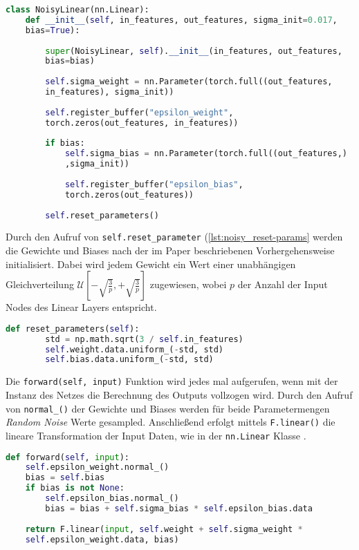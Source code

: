 \documentclass[11pt]{scrartcl}
\begin{document}
\begin{lstlisting}[language=Python, caption=Konstruktor Noisy Layer, label=lst:noisy-layer]
class NoisyLinear(nn.Linear):
	def __init__(self, in_features, out_features, sigma_init=0.017, 
	bias=True):
		
		super(NoisyLinear, self).__init__(in_features, out_features,
		bias=bias)
		
		self.sigma_weight = nn.Parameter(torch.full((out_features,
		in_features), sigma_init))
		
		self.register_buffer("epsilon_weight", 
		torch.zeros(out_features, in_features))
		
		if bias:
    		self.sigma_bias = nn.Parameter(torch.full((out_features,)
    		,sigma_init))
    		
    		self.register_buffer("epsilon_bias", 
    		torch.zeros(out_features))
    		
		self.reset_parameters()
\end{lstlisting}

Durch den Aufruf von \lstinline!self.reset_parameter! (\ref{lst:noisy_reset-params} werden die
Gewichte und Biases nach der im Paper beschriebenen Vorhergehensweise initialisiert. Dabei wird
jedem Gewicht ein Wert einer unabhängigen Gleichverteilung
$\mathcal{U}[-\sqrt{\frac{3}{p}},+\sqrt{\frac{3}{p}}]$ zugewiesen, wobei $p$ der Anzahl der
Input Nodes des Linear Layers entspricht.
 
\begin{lstlisting}[language=Python, caption=Reinitialisierung der Gewichte und Biases, 
label=lst:noisy_reset-params]
	def reset_parameters(self):
		std = np.math.sqrt(3 / self.in_features)
		self.weight.data.uniform_(-std, std)
		self.bias.data.uniform_(-std, std)
\end{lstlisting}

Die \lstinline!forward(self, input)! Funktion wird jedes mal aufgerufen, wenn mit der Instanz
des Netzes die Berechnung des Outputs vollzogen wird. Durch den Aufruf von 
\lstinline!normal_()! der Gewichte und Biases werden für beide Parametermengen 
\textit{Random Noise} Werte gesampled. Anschließend erfolgt mittels \lstinline!F.linear()!
die lineare Transformation der Input Daten, wie in der \lstinline!nn.Linear! Klasse 
\cite[~S.179 ff.]{L2018}.

\begin{lstlisting}[language=Python, caption=\textit{forward()} Funktion Noisy Layer, 
label=lst:noisy_forward]
	def forward(self, input):
	self.epsilon_weight.normal_()
	bias = self.bias
	if bias is not None:
	    self.epsilon_bias.normal_()
	    bias = bias + self.sigma_bias * self.epsilon_bias.data
		
	return F.linear(input, self.weight + self.sigma_weight *
	self.epsilon_weight.data, bias)
\end{lstlisting}
\end{document}
